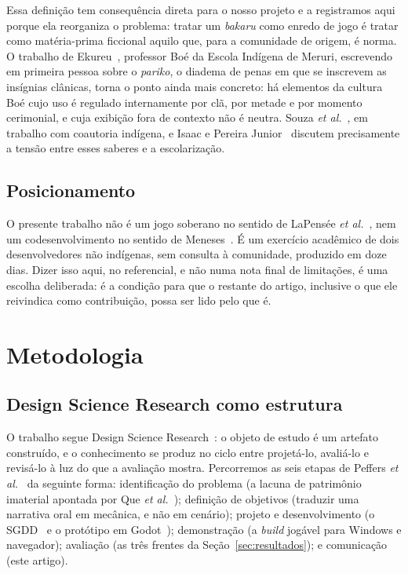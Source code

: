 \documentclass[conference]{IEEEtran}
\begin{document}
Essa definição tem consequência direta para o nosso projeto e a registramos aqui porque
ela reorganiza o problema: tratar um \textit{bakaru} como enredo de jogo é tratar como
matéria-prima ficcional aquilo que, para a comunidade de origem, é norma. O trabalho de
Ekureu~\cite{ekureu2025}, professor Boé da Escola Indígena de Meruri, escrevendo em
primeira pessoa sobre o \textit{pariko}, o diadema de penas em que se inscrevem as
insígnias clânicas, torna o ponto ainda mais concreto: há elementos da cultura Boé cujo
uso é regulado internamente por clã, por metade e por momento cerimonial, e cuja
exibição fora de contexto não é neutra. Souza \textit{et al.}~\cite{souzaboe2025}, em
trabalho com coautoria indígena, e Isaac e Pereira Junior~\cite{isaac2021} discutem
precisamente a tensão entre esses saberes e a escolarização.

\subsection{Posicionamento}

O presente trabalho não é um jogo soberano no sentido de LaPensée
\textit{et al.}~\cite{lapensee2022}, nem um codesenvolvimento no sentido de
Meneses~\cite{meneses2017}. É um exercício acadêmico de dois desenvolvedores não
indígenas, sem consulta à comunidade, produzido em doze dias. Dizer isso aqui, no
referencial, e não numa nota final de limitações, é uma escolha deliberada: é a condição
para que o restante do artigo, inclusive o que ele reivindica como contribuição, possa
ser lido pelo que é.

\section{Metodologia}
\label{sec:metodo}

\subsection{Design Science Research como estrutura}

O trabalho segue Design Science Research~\cite{hevner2004,peffers2007}: o objeto de
estudo é um artefato construído, e o conhecimento se produz no ciclo entre projetá-lo,
avaliá-lo e revisá-lo à luz do que a avaliação mostra. Percorremos as seis etapas de
Peffers \textit{et al.}~\cite{peffers2007} da seguinte forma: identificação do problema
(a lacuna de patrimônio imaterial apontada por Que \textit{et al.}~\cite{que2025});
definição de objetivos (traduzir uma narrativa oral em mecânica, e não em cenário);
projeto e desenvolvimento (o SGDD~\cite{sgdd2026} e o protótipo em
Godot~\cite{repo2026}); demonstração (a \textit{build} jogável para Windows e
navegador); avaliação (as três frentes da Seção~\ref{sec:resultados}); e comunicação
(este artigo).
\end{document}
